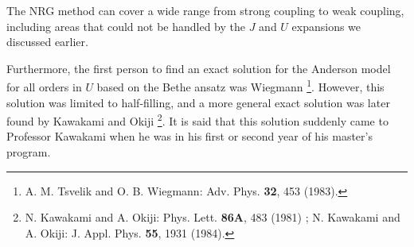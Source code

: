 \documentclass[a4j]{jarticle}
\begin{document}
The NRG method can cover a wide range from strong coupling to weak coupling, including areas that could not be handled by the $J$ and $U$ expansions we discussed earlier.

Furthermore, the first person to find an exact solution for the Anderson model for all orders in $U$ based on the Bethe ansatz was Wiegmann
\footnote{
	A. M. Tsvelik and O. B. Wiegmann: Adv. Phys. {\bf 32}, 453 (1983).
}.
However, this solution was limited to half-filling, and a more general exact solution was later found by Kawakami and Okiji
\footnote{
	N. Kawakami and A. Okiji: Phys. Lett. {\bf 86A}, 483 (1981) ;
	N. Kawakami and A. Okiji: J. Appl. Phys. {\bf 55}, 1931 (1984).
}.
It is said that this solution suddenly came to Professor Kawakami when he was in his first or second year of his master's program.
\end{document}
